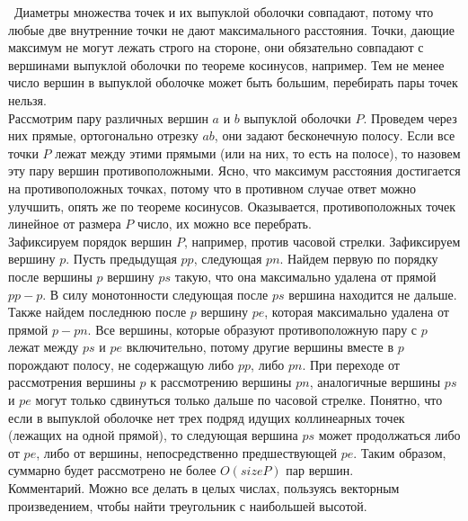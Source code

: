 \indent\indent\
Диаметры множества точек и их выпуклой оболочки совпадают,
потому что любые две внутренние точки не дают максимального
расстояния. Точки, дающие максимум не могут лежать строго на стороне,
они обязательно совпадают с вершинами выпуклой оболочки
по теореме косинусов, например. Тем не менее число вершин
в выпуклой оболочке может быть большим, перебирать
пары точек нельзя.\\
Рассмотрим пару различных вершин $a$ и $b$ выпуклой оболочки $P$. Проведем
через них прямые, ортогонально отрезку $ab$, они задают бесконечную
полосу. Если все точки $P$ лежат
между этими прямыми (или на них, то есть на полосе),
то назовем эту пару вершин противоположными.
Ясно, что максимум расстояния достигается на противоположных точках,
потому что в противном случае ответ можно улучшить, опять же
по теореме косинусов.
Оказывается, противоположных точек линейное от размера $P$ число,
их можно все перебрать.\\
Зафиксируем порядок вершин $P$, например, против часовой стрелки. Зафиксируем
вершину $p$. Пусть предыдущая $pp$, следующая $pn$. Найдем первую
по порядку после вершины $p$ вершину $ps$ такую, что она максимально
удалена от прямой $pp-p$. В силу монотонности следующая после $ps$ вершина
находится не дальше. Также найдем последнюю после $p$ вершину $pe$,
которая максимально удалена от прямой $p-pn$. Все вершины, которые образуют
противоположную пару с $p$ лежат между $ps$ и $pe$ включительно,
потому другие вершины вместе в $p$ порождают полосу, не содержащую
либо $pp$, либо $pn$. При переходе от рассмотрения вершины $p$ к рассмотрению
вершины $pn$, аналогичные вершины $ps$ и $pe$ могут только сдвинуться
только дальше по часовой стрелке. Понятно, что если в выпуклой оболочке нет
трех подряд идущих коллинеарных точек (лежащих на одной прямой), то
следующая вершина $ps$ может продолжаться либо от $pe$, либо от вершины,
непосредственно предшествующей $pe$. Таким образом, суммарно
будет рассмотрено не более $O(size P)$ пар вершин.\\

Комментарий. Можно все делать в целых числах, пользуясь векторным
произведением, чтобы найти треугольник с наибольшей высотой.
